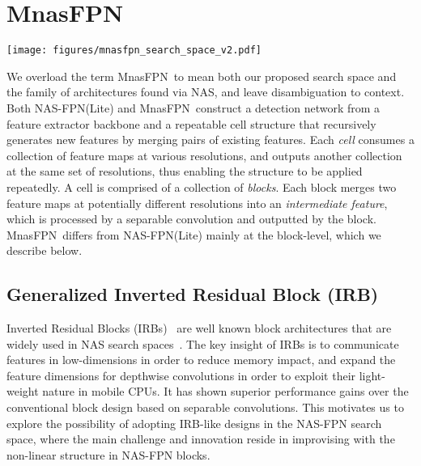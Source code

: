 \documentclass[10pt,twocolumn,letterpaper]{article}
\def\Mnasfpn{MnasFPN~}
\begin{document}
 

\section{\Mnasfpn}

\begin{figure*}[!t]
    \centering
    \texttt{[image: figures/mnasfpn\_search\_space\_v2.pdf]}
    \caption{A searchable \Mnasfpn block. \Mnasfpn re-introduces the Inverted Residual Block (IRB) into the NAS-FPN head (Sec.~\ref{sec:irb}). Any path connecting an input and a new feature, as highlighted in blue dashed rectangle, resembles an IRB. \Mnasfpn also employs Size Dependent Ordering (SDO) shown in black rectangle to re-order the resizing operation and the $1\times1$ convolution prior to feature merging (Sec.~\ref{sec:sdo}). Search-able components are highlighted in red (Sec.~\ref{sec:search_space}).}
\label{fig:search_space}
\end{figure*}

We overload the term \Mnasfpn to mean both our proposed search space and the family of architectures found via NAS, and leave disambiguation to context. Both NAS-FPN(Lite) and \Mnasfpn construct a detection network from a feature extractor backbone and a repeatable cell structure that recursively generates new features by merging pairs of existing features. Each {\it cell} consumes a collection of feature maps at various resolutions, and outputs another collection at the same set of resolutions, thus enabling the structure to be applied repeatedly. A cell is comprised of a collection of {\it blocks}. Each block merges two feature maps at potentially different resolutions into an {\it intermediate feature}, which is processed by a separable convolution and outputted by the block. \Mnasfpn differs from NAS-FPN(Lite) mainly at the block-level, which we describe below.


\subsection{Generalized Inverted Residual Block (IRB)}
\label{sec:irb}

Inverted Residual Blocks (IRBs)~\cite{sandler2018mobilenetv2} are well known block architectures that are widely used in NAS search spaces~\cite{tan2019mnasnet, cai2018proxylessnas, howard2019searching, wu2019fbnet}. The key insight of IRBs is to communicate features in low-dimensions in order to reduce memory impact, and expand the feature dimensions for depthwise convolutions in order to exploit their light-weight nature in mobile CPUs. It has shown superior performance gains over the conventional block design based on separable convolutions. This motivates us to explore the possibility of adopting IRB-like designs in the NAS-FPN search space, where the main challenge and innovation reside in improvising with the non-linear structure in NAS-FPN blocks.
\end{document}
